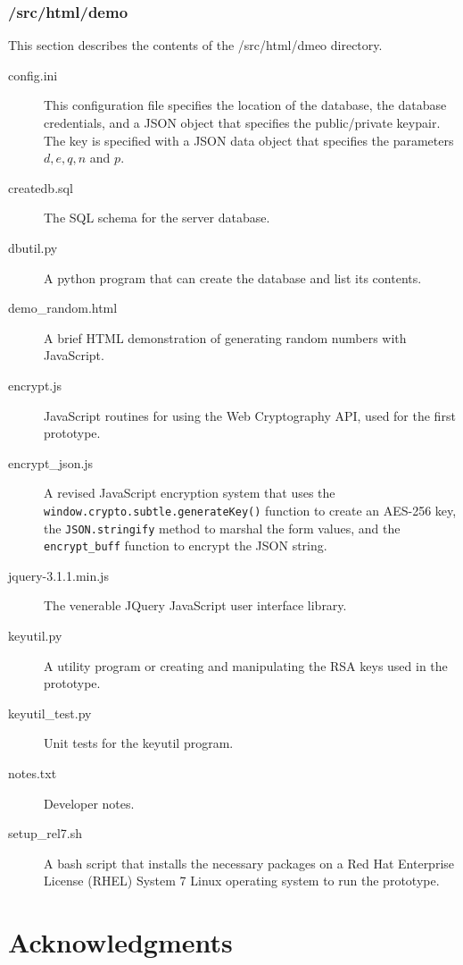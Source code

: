 \documentclass[fleqn,10pt]{wlscirep}
\begin{document}
\subsubsection{/src/html/demo}
This section describes the contents of the /src/html/dmeo directory.

\begin{description}
  \item[config.ini] This configuration file specifies the location of
    the database, the database credentials, and a JSON object that
    specifies the public/private keypair. The key is specified with a
    JSON data object that specifies the parameters $d, e, q, n$ and $p$.
  \item[createdb.sql] The SQL schema for the server database.
  \item[dbutil.py] A python program that can create the database and
    list its contents.
  \item[demo\_random.html] A brief HTML demonstration of generating
    random numbers with JavaScript.
  \item[encrypt.js] JavaScript routines for using the Web Cryptography
    API, used for the first prototype.
  \item[encrypt\_json.js] A revised JavaScript encryption system that
    uses the \verb|window.crypto.subtle.generateKey()| function to
    create an AES-256 key, the \verb|JSON.stringify| method to marshal
    the form values, and the \verb|encrypt_buff| function to encrypt
    the JSON string.
  \item[jquery-3.1.1.min.js] The venerable JQuery JavaScript user
    interface library.
  \item[keyutil.py] A utility program or creating and manipulating
    the RSA keys used in the prototype.
  \item[keyutil\_test.py] Unit tests for the keyutil program.
  \item[notes.txt] Developer notes.
  \item[setup\_rel7.sh] A bash script that installs the necessary
    packages on a Red Hat Enterprise License (RHEL) System 7 Linux
    operating system to run the prototype.
\end{description}



%


\section{Acknowledgments}
\end{document}
